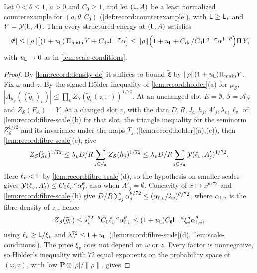 \begin{proposition}
\label{prop:record:density-structured}
Let $0<\theta\le1$, $a>0$ and $C_0\ge1$, and let $(\Lsc,A)$ be a least
normalized counterexample for $(a,\theta,C_0)$
(\cref{def:record:counterexample}), with $\Lsc\ge\Lsc_*$ and
$Y=\Yf(\Lsc,A)$. Then every structured energy at $(\Lsc,A)$ satisfies
\[
 |\mathfrak E|\le\|\rho\|\big[(1+u_\Lsc)\,\Pi_{\rm main}\,Y
 +C_{\rm dc}\Lsc^{-\sigma}\alpha\big]
 \le\|\rho\|\Big(1+u_\Lsc+\frac{C_{\rm dc}}{C_0}\Lsc^{a-\sigma}
 \alpha^{1-\theta}\Big)\Pi\,Y,
\]
with $u_\Lsc\to0$ as in \cref{lem:scale-conditions}.
\end{proposition}

\begin{proof}
By \cref{lem:record:density-dc} it suffices to bound $\widetilde{\mathfrak E}$
by $\|\rho\|(1+u_\Lsc)\Pi_{\rm main}Y$. Fix $\omega$ and $z$. By the signed
H\"older inequality of \cref{lem:record:holder}(a) for $\mu_{\mathcal S}$,
$|\Lambda_{\mu_{\mathcal S}}((\widetilde g_v)_v)|\le
\prod_vZ_{\mathcal S}(\widetilde g_v(z_v,\cdot))^{1/72}$. At an unchanged slot
$E=\emptyset$, $\mathcal S=\mathcal A_N$ and $Z_{\mathcal S}(F_A)=Y$. At a
changed slot $v$, with the data $D,R,J_{\mathfrak a},h_j,A'_j,\lambda_v,\ell_v$ of
\cref{lem:record:fibre-scale}(b) for that slot, the triangle inequality for
the seminorm $Z_{\mathcal S}^{1/72}$ and its invariance under the maps $T_j$
(\cref{lem:record:holder}(a),(c)), then \cref{lem:record:fibre-scale}(c), give
\[
 Z_{\mathcal S}(\widetilde g_v)^{1/72}\le\lambda_v\frac DR\sum_{j\in J_{\mathfrak a}}
 Z_{\mathcal S}(h_j)^{1/72}\le\lambda_v\frac DR\sum_{j\in J_{\mathfrak a}}
 \Yf(\ell_v,A'_j)^{1/72}.
\]
Here $\ell_v<\Lsc$ by \cref{lem:record:fibre-scale}(d), so the hypothesis on
smaller scales gives $\Yf(\ell_v,A'_j)\le C_0\ell_v^{-a}\alpha_j^\theta$, also
when $A'_j=\emptyset$. Concavity of $x\mapsto x^{\theta/72}$ and
\cref{lem:record:fibre-scale}(b) give
$\frac DR\sum_j\alpha_j^{\theta/72}\le(\alpha_{{\rm f},v}/\lambda_v)^{\theta/72}$,
where $\alpha_{{\rm f},v}$ is the fibre density of $z_v$, hence
\[
 Z_{\mathcal S}(\widetilde g_v)\le\lambda_v^{72-\theta}C_0\ell_v^{-a}\alpha_{{\rm f},v}^\theta
 \le(1+u_\Lsc)C_0\Lsc^{-a}\xi_v^a\alpha_{{\rm f},v}^\theta ,
\]
using $\ell_v\ge\Lsc/\xi_v$ and $\lambda_v^{72}\le1+u_\Lsc$
(\cref{lem:record:fibre-scale}(d), \cref{lem:scale-conditions}). The price
$\xi_v$ does not depend on $\omega$ or $z$. Every factor is nonnegative, so
H\"older's inequality with $72$ equal exponents on the probability space of
$(\omega,z)$, with law $\mathbf P\otimes|\rho|/\|\rho\|$, gives

\end{proof}

